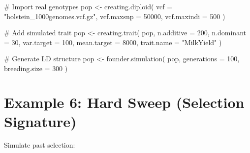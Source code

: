 \documentclass[
  letterpaper,
]{book}
\newenvironment{Shaded}{\begin{snugshade}}{\end{snugshade}}
\newcommand{\AttributeTok}[1]{\textcolor[rgb]{0.40,0.45,0.13}{#1}}
\newcommand{\CommentTok}[1]{\textcolor[rgb]{0.37,0.37,0.37}{#1}}
\newcommand{\DecValTok}[1]{\textcolor[rgb]{0.68,0.00,0.00}{#1}}
\newcommand{\FunctionTok}[1]{\textcolor[rgb]{0.28,0.35,0.67}{#1}}
\newcommand{\NormalTok}[1]{\textcolor[rgb]{0.00,0.23,0.31}{#1}}
\newcommand{\OtherTok}[1]{\textcolor[rgb]{0.00,0.23,0.31}{#1}}
\newcommand{\StringTok}[1]{\textcolor[rgb]{0.13,0.47,0.30}{#1}}
\begin{document}
\begin{Shaded}
\begin{Highlighting}[]
\CommentTok{\# Import real genotypes}
\NormalTok{pop }\OtherTok{\textless{}{-}} \FunctionTok{creating.diploid}\NormalTok{(}
  \AttributeTok{vcf =} \StringTok{"holstein\_1000genomes.vcf.gz"}\NormalTok{,}
  \AttributeTok{vcf.maxsnp =} \DecValTok{50000}\NormalTok{,}
  \AttributeTok{vcf.maxindi =} \DecValTok{500}
\NormalTok{)}

\CommentTok{\# Add simulated trait}
\NormalTok{pop }\OtherTok{\textless{}{-}} \FunctionTok{creating.trait}\NormalTok{(}
\NormalTok{  pop,}
  \AttributeTok{n.additive =} \DecValTok{200}\NormalTok{,}
  \AttributeTok{n.dominant =} \DecValTok{30}\NormalTok{,}
  \AttributeTok{var.target =} \DecValTok{100}\NormalTok{,}
  \AttributeTok{mean.target =} \DecValTok{8000}\NormalTok{,}
  \AttributeTok{trait.name =} \StringTok{"MilkYield"}
\NormalTok{)}

\CommentTok{\# Generate LD structure}
\NormalTok{pop }\OtherTok{\textless{}{-}} \FunctionTok{founder.simulation}\NormalTok{(}
\NormalTok{  pop,}
  \AttributeTok{generations =} \DecValTok{100}\NormalTok{,}
  \AttributeTok{breeding.size =} \DecValTok{300}
\NormalTok{)}
\end{Highlighting}
\end{Shaded}

\section{Example 6: Hard Sweep (Selection
Signature)}\label{sec-example-hard-sweep}

Simulate past selection:
\end{document}
